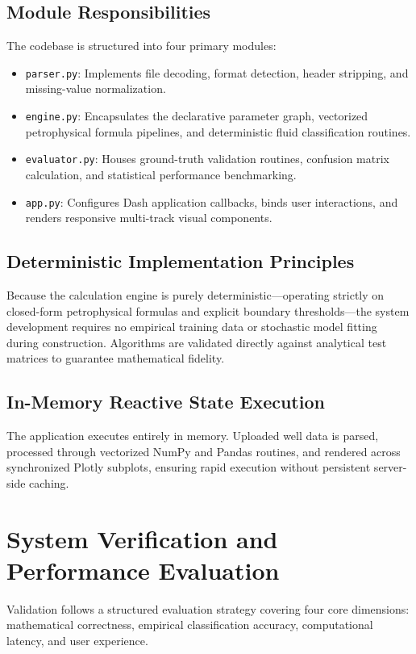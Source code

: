 \subsection{Module Responsibilities}
The codebase is structured into four primary modules:
\begin{itemize}
    \item \texttt{parser.py}: Implements file decoding, format detection, header stripping, and missing-value normalization.
    \item \texttt{engine.py}: Encapsulates the declarative parameter graph, vectorized petrophysical formula pipelines, and deterministic fluid classification routines.
    \item \texttt{evaluator.py}: Houses ground-truth validation routines, confusion matrix calculation, and statistical performance benchmarking.
    \item \texttt{app.py}: Configures Dash application callbacks, binds user interactions, and renders responsive multi-track visual components.
\end{itemize}

\subsection{Deterministic Implementation Principles}
Because the calculation engine is purely deterministic—operating strictly on closed-form petrophysical formulas and explicit boundary thresholds—the system development requires no empirical training data or stochastic model fitting during construction. Algorithms are validated directly against analytical test matrices to guarantee mathematical fidelity.

\subsection{In-Memory Reactive State Execution}
The application executes entirely in memory. Uploaded well data is parsed, processed through vectorized NumPy and Pandas routines, and rendered across synchronized Plotly subplots, ensuring rapid execution without persistent server-side caching.

\section{System Verification and Performance Evaluation}

Validation follows a structured evaluation strategy covering four core dimensions: mathematical correctness, empirical classification accuracy, computational latency, and user experience.

